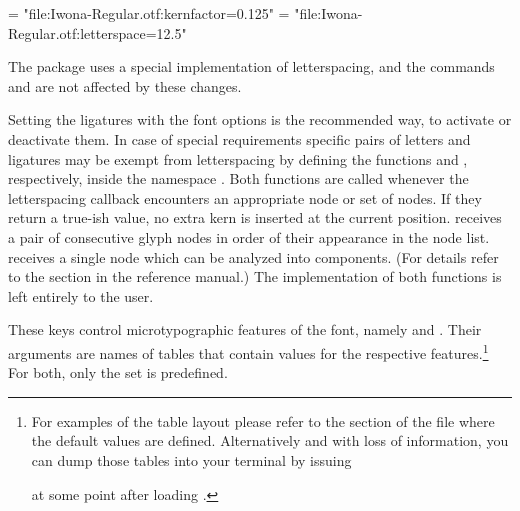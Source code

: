          \beginlisting
    \font \iwonakernedA = "file:Iwona-Regular.otf:kernfactor=0.125"
    \font \iwonakernedB = "file:Iwona-Regular.otf:letterspace=12.5"
         \endlisting

         The  package uses a special implementation of letterspacing, and the commands \inlinecode{\lsstyle} and \inlinecode{\textls} are  not affected by these changes.

         Setting the ligatures with the font options is the recommended way, to activate or deactivate them. In case of special requirements
         specific pairs of letters and ligatures may be exempt from
         letterspacing by defining the \LUA functions
          and ,
         respectively, inside the namespace .
         Both functions are called whenever the letterspacing callback
         encounters an appropriate node or set of nodes.
         If they return a true-ish value, no extra kern is inserted at
         the current position.
          receives a pair of consecutive
         glyph nodes in order of their appearance in the node list.
          receives a single node which can be
         analyzed into components.
         (For details refer to the  section in the
         \LUATEX reference manual.)
         The implementation of both functions is left entirely to the
         user.
  \endaltitem

\iffalse
  \startbuffer [printvectors]
  \directlua{inspect(fonts.protrusions.setups.default)
             inspect(fonts.expansions.setups.default)}
  \stopbuffer
\fi

         These keys control microtypographic features of the font,
         namely  and .
         Their arguments are names of \LUA tables that contain
         values for the respective features.\footnote{%
            For examples of the table layout please refer to the
            section of the file  where the
            default values are defined.
            Alternatively and with loss of information, you can dump
            those tables into your terminal by issuing
            \unless \iffalse
              \beginlisting
 \directlua{inspect(fonts.protrusions.setups.default)
            inspect(fonts.expansions.setups.default)}
              \endlisting
            \else
              \typebuffer [printvectors]
            \fi
            at some point after loading .
         }
         For both, only the set  is predefined.

